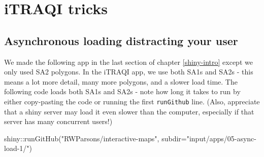 \documentclass[
]{book}
\newenvironment{Shaded}{\begin{snugshade}}{\end{snugshade}}
\newcommand{\AttributeTok}[1]{\textcolor[rgb]{0.77,0.63,0.00}{#1}}
\newcommand{\FunctionTok}[1]{\textcolor[rgb]{0.00,0.00,0.00}{#1}}
\newcommand{\NormalTok}[1]{#1}
\newcommand{\SpecialCharTok}[1]{\textcolor[rgb]{0.00,0.00,0.00}{#1}}
\newcommand{\StringTok}[1]{\textcolor[rgb]{0.31,0.60,0.02}{#1}}
\begin{document}
\hypertarget{async-loading}{%
\chapter{iTRAQI tricks}\label{async-loading}}

\hypertarget{asynchronous-loading-distracting-your-user}{%
\section{Asynchronous loading distracting your user}\label{asynchronous-loading-distracting-your-user}}

We made the following app in the last section of chapter \ref{shiny-intro} except we only used SA2 polygons. In the iTRAQI app, we use both SA1s and SA2s - this means a lot more detail, many more polygons, and a slower load time. The following code loads both SA1s and SA2s - note how long it takes to run by either copy-pasting the code or running the first \texttt{runGithub} line. (Also, appreciate that a shiny server may load it even slower than the computer, especially if that server has many concurrent users!)

\begin{Shaded}
\begin{Highlighting}[]
\NormalTok{shiny}\SpecialCharTok{::}\FunctionTok{runGitHub}\NormalTok{(}\StringTok{"RWParsons/interactive{-}maps"}\NormalTok{, }\AttributeTok{subdir=}\StringTok{"input/apps/05{-}async{-}load{-}1/"}\NormalTok{)}
\end{Highlighting}
\end{Shaded}
\end{document}
